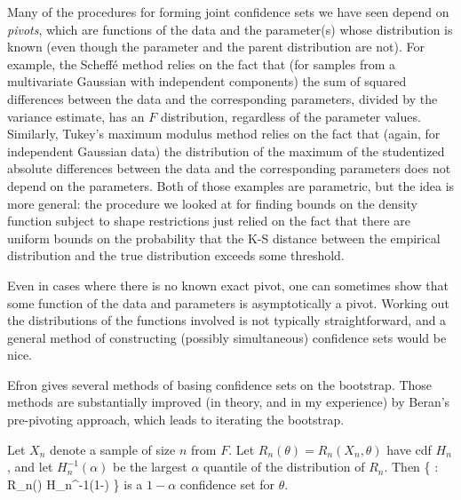 Many of the procedures for forming joint confidence sets we have seen depend on
{\em pivots}, which are functions of the data and the parameter(s) whose
distribution is known (even though the parameter and the parent distribution are not).
For example, the Scheff\'{e} method relies on the fact that (for samples from
a multivariate Gaussian with independent components)
the sum of squared differences between the data and the corresponding parameters,
divided by the variance estimate, has an $F$ distribution, regardless of the
parameter values.
Similarly, Tukey's maximum modulus method relies on the fact that
(again, for independent Gaussian data) the distribution
of the maximum of the studentized
absolute differences between the data and the corresponding
parameters does not depend on the parameters.
Both of those examples are parametric, but the idea is more general:
the procedure we looked at for finding bounds on the density function subject
to shape restrictions just relied on the fact that there are uniform
bounds on the probability that the K-S distance between the empirical
distribution and the true distribution exceeds some threshold.

Even in cases where there is no known exact pivot, one can sometimes show that
some function of the data and parameters is asymptotically a pivot.
Working out the distributions of the functions involved is not typically
straightforward, and a general method of constructing (possibly
simultaneous) confidence sets  would be nice.

Efron gives several methods of basing confidence sets on the bootstrap.
Those methods are substantially improved (in theory, and in my experience)
by Beran's pre-pivoting approach, which leads to iterating the bootstrap.

Let $X_n$ denote a sample of size $n$ from $F$.
Let $R_n(\theta) = R_n(X_n, \theta)$ have cdf
$H_n$, and let $H_n^{-1}(\alpha)$
be the largest $\alpha$ quantile of the distribution of $R_n$.
Then
\beq
        \{ \gamma \in \Theta : R_n(\gamma) \le H_n^{-1}(1-\alpha) \}
\eeq
is a $1-\alpha$ confidence set for $\theta$.

